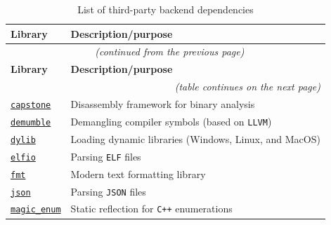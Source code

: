 \documentclass[english, ing, kiv, he, iso690numb, pdf]{fasthesis}
\begin{document}
	\begin{center}
		\begin{longtable}{p{}p{}}
			\caption{List of third-party backend dependencies}
			\label{List of third-party backend dependencies}\\
			\toprule[1.5pt]
			\textbf{Library} & \textbf{Description/purpose}\\
			\midrule
			\endfirsthead
			\multicolumn{2}{c}{\tablename{}~\thetable{} \textit{(continued from the previous page)}}\\
			\midrule
			\textbf{Library} & \textbf{Description/purpose}\\
			\midrule
			\endhead
			\midrule
			\multicolumn{2}{r}{\textit{(table continues on the next page)}}\\
			\endfoot
			\bottomrule[1.5pt]
			\endlastfoot
			\href{https://github.com/capstone-engine/capstone/tree/88d7b19a6cbff470b81bb7eb3cb49e592d549624}{\texttt{capstone}} & Disassembly framework for binary analysis\\
			
			\href{https://github.com/nico/demumble/tree/df938e45c2b0e064fb5323d88b692d03b451d271}{\texttt{demumble}} & Demangling compiler symbols (based on \texttt{LLVM})\\
			
			\href{https://github.com/martin-olivier/dylib/tree/eb3acadbd7759444757ae2b72bed77a4fd755454}{\texttt{dylib}} & Loading dynamic libraries (Windows, Linux, and MacOS)\\
			
			\href{https://github.com/serge1/ELFIO/tree/d251da09a07dff40af0b63b8f6c8ae71d2d1938d}{\texttt{elfio}} & Parsing \texttt{ELF} files \\
			
			\href{https://github.com/fmtlib/fmt/tree/3a69529e8b80432d284e45c228bc4341b2178414}{\texttt{fmt}} & Modern text formatting library \\
			
			\href{https://github.com/nlohmann/json/tree/c71ecde505ebf236048a731c81ae8ecaf2b260a8}{\texttt{json}} & Parsing \texttt{JSON} files\\
			
			\href{https://github.com/Neargye/magic_enum/tree/95c71dab42acb62bf5d4a781e8f29982f7f3046e}{\texttt{magic\_enum}} & Static reflection for \texttt{C++} enumerations\\
		\end{longtable}
	\end{center}
	
\end{document}
